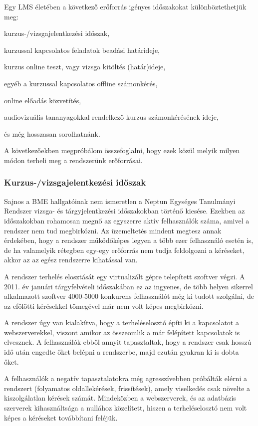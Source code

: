 Egy LMS életében a következő erőforrás igényes időszakokat különböztethetjük meg:
\begin{sajat_itemize}
\item kurzus-/vizsgajelentkezési időszak,
\item kurzussal kapcsolatos feladatok beadási határideje,
\item kurzus online teszt, vagy vizsga kitöltés (határ)ideje,
\item egyéb a kurzussal kapcsolatos offline számonkérés,
\item online előadás közvetítés,
\item audiovizuális tananyagokkal rendelkező kurzus számonkérésének ideje, 
\end{sajat_itemize}
és még hosszasan sorolhatnánk.

A következőekben megpróbálom összefoglalni, hogy ezek közül melyik milyen módon terheli meg a rendszerünk erőforrásai.

\subsubsection{Kurzus-/vizsgajelentkezési időszak}

Sajnos a BME hallgatóinak nem ismeretlen a Neptun Egységes Tanulmányi Rendszer vizsga- és tárgyjelentkezési időszakokban történő kiesése. Ezekben az időszakokban rohamosan megnő az egyszerre aktív felhasználók száma, amivel a rendszer nem tud megbirkózni. Az üzemeltetés mindent megtesz annak érdekében, hogy a rendszer működőképes legyen a több ezer felhasználó esetén is, de ha valamelyik rétegben egy-egy erőforrás nem tudja feldolgozni a kéréseket, akkor az az egész rendszerre kihatással van.

A rendszer terhelés elosztását egy virtualizált gépre telepített szoftver végzi.\cite{neptun2} A 2011. év januári tárgyfelvételi időszakában ez az ingyenes, de több helyen sikerrel alkalmazott szoftver 4000-5000 konkurens felhasználót még ki tudott szolgálni, de az efölötti kérésekkel tömegével már nem volt képes megbirkózni.

A rendszer úgy van kialakítva, hogy a terheléselosztó építi ki a kapcsolatot a webszerverekkel, viszont amikor az összeomlik a már felépített kapcsolatok is elvesznek. A felhasználók ebből annyit tapasztaltak, hogy a rendszer csak hosszú idő után engedte őket belépni a rendszerbe, majd ezután gyakran ki is dobta őket.

A felhasználók a negatív tapasztalatokra még agresszívebben próbálták elérni a rendszert (folyamatos oldallekérések, frissítések), amely viselkedés csak növelte a kiszolgálatlan kérések számát. Mindeközben a webszerverek, és az adatbázis szerverek kihasználtsága a nullához közelített, hiszen a terheléselosztó nem   volt képes a kéréseket továbbítani feléjük.

